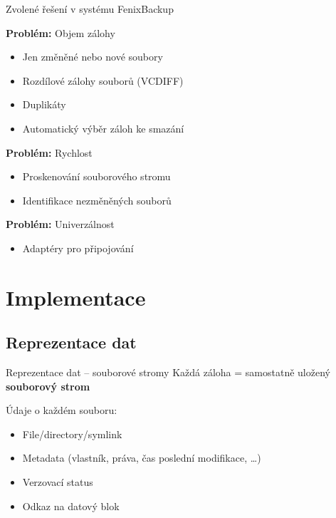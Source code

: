 \documentclass{beamer}				%
\begin{document}
\begin{frame}{Zvolené řešení v systému FenixBackup}

{\bf Problém:} Objem zálohy
\begin{itemize}
	\item Jen změněné nebo nové soubory
	\pause\item Rozdílové zálohy souborů (VCDIFF)
	\pause\item Duplikáty
	\pause\item Automatický výběr záloh ke smazání
\end{itemize}

\bigskip\pause

{\bf Problém:} Rychlost
\begin{itemize}
	\item Proskenování souborového stromu
	\pause\item Identifikace nezměněných souborů
\end{itemize}

\bigskip\pause

{\bf Problém:} Univerzálnost
\begin{itemize}
	\item Adaptéry pro připojování
\end{itemize}

\end{frame}

\section{Implementace}
\subsection{Reprezentace dat}

\begin{frame}{Reprezentace dat -- souborové stromy}
Každá záloha = samostatně uložený {\bf souborový strom}

\pause\bigskip

Údaje o každém souboru:
\begin{itemize}
	\item File/directory/symlink
	\pause\item Metadata (vlastník, práva, čas poslední modifikace, \dots)
	\pause\item Verzovací status
	\item Odkaz na datový blok
\end{itemize}
\end{frame}
\end{document}

